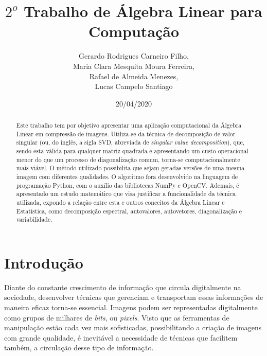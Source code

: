 \documentclass[a4paper,12pt]{article}
\title{$2^o$ Trabalho de Álgebra Linear para Computação}
\author{Gerardo Rodrigues Carneiro Filho,\\ Maria Clara Mesquita Moura Ferreira,\\ Rafael de Almeida Menezes,\\ Lucas Campelo Santiago}
\date{20/04/2020}
\begin{document}
\maketitle

\begin{abstract}
Este trabalho tem por objetivo apresentar uma aplicação computacional da Álgebra Linear em compressão de imagens. Utiliza-se da técnica de decomposição de valor singular (ou, do inglês, a sigla SVD, abreviada de \textit{singular value decomposition}), que, sendo esta válida para qualquer matriz quadrada e apresentando um custo operacional menor do que um processo de diagonalização comum, torna-se computacionalmente mais viável. O método utilizado possibilita que sejam geradas versões de uma mesma imagem com diferentes qualidades. O algoritmo fora desenvolvido na linguagem de programação Python, com o auxílio das bibliotecas NumPy e OpenCV. Ademais, é apresentado um estudo matemático que visa justificar a funcionalidade da técnica utilizada, expondo a relação entre esta e outros conceitos da Álgebra Linear e Estatística, como decomposição espectral, autovalores, autovetores, diagonalização e variabilidade.
\end{abstract}

\section{Introdução}
\label{sec:introducao}




Diante do constante crescimento de informação que circula digitalmente na sociedade, desenvolver técnicas que gerenciam e transportam essas informações de maneira eficaz torna-se essencial. Imagens podem ser representadas digitalmente como grupos de milhares de \textit{bits}, ou \textit{pixels}. Visto que as ferramentas de manipulação estão cada vez mais sofisticadas, possibilitando a criação de imagens com grande qualidade, é inevitável a necessidade de técnicas que facilitem também, a circulação desse tipo de informação.
\end{document}
